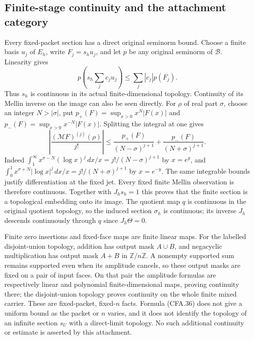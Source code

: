 \subsection{Finite-stage continuity and the attachment category}

Every fixed-packet section has a direct original seminorm bound.
Choose a finite basis $u_j$ of $E_h$, write $F_j=s_hu_j$, and let
$p$ be any original seminorm of $\mathscr B$.  Linearity gives
\[
 p\left(s_h\sum_j c_ju_j\right)
                \le\sum_j|c_j|p(F_j).                       \tag{CFA.36}
\]
Thus $s_h$ is continuous in its actual finite-dimensional topology.
Continuity of its Mellin inverse on the image can also be seen
directly.  For $\rho$ of real part $\sigma$, choose an integer
$N>|\sigma|$, put
$p_+(F)=\sup_{x>0}x^N|F(x)|$ and
$p_-(F)=\sup_{x>0}x^{-N}|F(x)|$.  Splitting the integral at one gives
\[
 \left|\frac{(\mathcal MF)^{(j)}(\rho)}{j!}\right|
 \le\frac{p_+(F)}{(N-\sigma)^{j+1}}
       +\frac{p_-(F)}{(N+\sigma)^{j+1}}.                     \tag{CFA.37}
\]
Indeed $\int_1^\infty x^{\sigma-N}(\log x)^j\,dx/x
=j!/(N-\sigma)^{j+1}$ by $x=e^y$, and
$\int_0^1x^{\sigma+N}|\log x|^j\,dx/x
=j!/(N+\sigma)^{j+1}$ by $x=e^{-y}$.
The same integrable bounds justify differentiation at the fixed
jet.  Every fixed finite Mellin observation is therefore continuous.
Together with $J_hs_h=1$ this proves that the finite section is a
topological embedding onto its image.  The quotient map $q$ is
continuous in the original quotient topology, so the induced section
$\sigma_h$ is continuous; its inverse $J_h$ descends continuously
through $q$ since $J_h\Theta=0$.

Finite zero insertions and fixed-face maps are finite linear maps.
For the labelled disjoint-union topology, addition has output mask
$A\cup B$, and negacyclic multiplication has output mask $A+B$
in $\mathbb Z/n\mathbb Z$.  A nonempty supported sum remains
supported even when its amplitude cancels, so these output masks
are fixed on a pair of input faces.  On that pair the amplitude
formulas are respectively linear and polynomial finite-dimensional
maps, proving continuity there; the disjoint-union topology proves
continuity on the whole finite mixed carrier.  These are fixed-packet,
fixed-$n$ facts.  Formula (CFA.36) does not give a uniform bound as
the packet or $n$ varies, and it does not identify the topology of an
infinite section $s_U$ with a direct-limit topology.  No such additional
continuity or estimate is asserted by this attachment.

